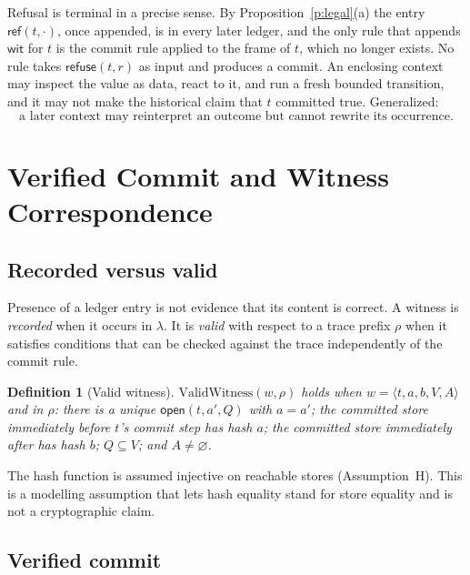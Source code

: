 \documentclass[11pt]{article}
\newtheorem{definition}{Definition}
\newcommand{\refuseval}{\mathsf{refuse}}
\begin{document}
Refusal is terminal in a precise sense. By Proposition~\ref{p:legal}(a) the entry $\mathsf{ref}(t,\cdot)$, once appended, is in every later ledger, and the only rule that appends $\mathsf{wit}$ for $t$ is the commit rule applied to the frame of $t$, which no longer exists. No rule takes $\refuseval(t,r)$ as input and produces a commit. An enclosing context may inspect the value as data, react to it, and run a fresh bounded transition, and it may not make the historical claim that $t$ committed true. Generalized:
\[
\text{a later context may reinterpret an outcome but cannot rewrite its occurrence.}
\]

\section{Verified Commit and Witness Correspondence}\label{s:corr}

\subsection{Recorded versus valid}

Presence of a ledger entry is not evidence that its content is correct. A witness is \emph{recorded} when it occurs in $\lambda$. It is \emph{valid} with respect to a trace prefix $\rho$ when it satisfies conditions that can be checked against the trace independently of the commit rule.

\begin{definition}[Valid witness]
$\mathrm{ValidWitness}(w,\rho)$ holds when $w=\langle t,a,b,V,A\rangle$ and in $\rho$: there is a unique $\mathsf{open}(t,a',Q)$ with $a=a'$; the committed store immediately before $t$'s commit step has hash $a$; the committed store immediately after has hash $b$; $Q\subseteq V$; and $A\neq\varnothing$.
\end{definition}

The hash function is assumed injective on reachable stores (Assumption~H). This is a modelling assumption that lets hash equality stand for store equality and is not a cryptographic claim.

\subsection{Verified commit}
\end{document}
